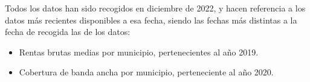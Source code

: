 Todos los datos han sido recogidos en diciembre de 2022, y hacen referencia a los datos más recientes disponibles a esa fecha, siendo las fechas más distintas a la fecha de recogida las de los datos:

\begin{itemize}
    \item Rentas brutas medias por municipio, pertenecientes al año 2019.
    \item Cobertura de banda ancha por municipio, perteneciente al año 2020.
\end{itemize}
